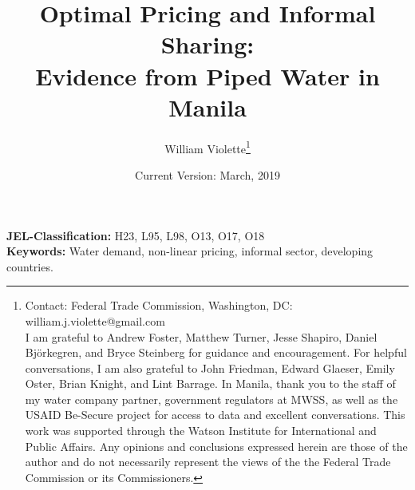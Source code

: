 \documentclass[12pt]{article}
\title{ Optimal Pricing and Informal Sharing: \\ Evidence from Piped Water in Manila }
\author{William Violette\thanks{Contact: Federal Trade Commission, Washington, DC: william.j.violette@gmail.com \\ I am grateful to Andrew Foster, Matthew Turner, Jesse Shapiro, Daniel Bj\"{o}rkegren, and Bryce Steinberg for guidance and encouragement.  For helpful conversations, I am also grateful to John Friedman, Edward Glaeser, Emily Oster, Brian Knight, and Lint Barrage.  In Manila, thank you to the staff of my water company partner, government regulators at MWSS, as well as the USAID Be-Secure project for access to data and excellent conversations.  This work was supported through the Watson Institute for International and Public Affairs.  Any opinions and conclusions expressed herein are those of the author and do not necessarily represent the views of the the Federal Trade Commission or its Commissioners.}
 }
\date{Current Version: March, 2019}
\begin{document}
\maketitle
\begin{abstract}











\end{abstract} 
\vspace{1cm}
{\bf JEL-Classification:} H23, L95, L98, O13, O17, O18 \\
\vspace{.1cm}
{\bf Keywords:} Water demand, non-linear pricing, informal sector, developing countries. 
\end{document}
